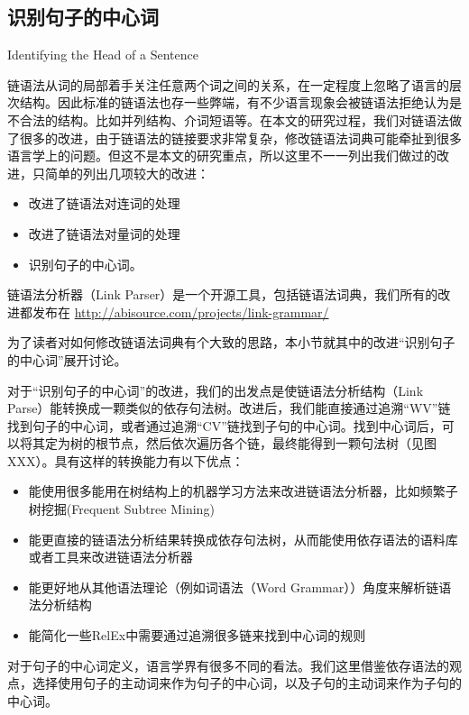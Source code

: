 \subsection{识别句子的中心词}{Identifying the Head of a Sentence}
\label{sec:head}

链语法从词的局部着手关注任意两个词之间的关系，在一定程度上忽略了语言的层次结构。因此标准的链语法也存一些弊端，有不少语言现象会被链语法拒绝认为是不合法的结构。比如并列结构、介词短语等。在本文的研究过程，我们对链语法做了很多的改进，由于链语法的链接要求非常复杂，修改链语法词典可能牵扯到很多语言学上的问题。但这不是本文的研究重点，所以这里不一一列出我们做过的改进，只简单的列出几项较大的改进：

\begin{itemize}
\item 改进了链语法对连词的处理
\item 改进了链语法对量词的处理
\item 识别句子的中心词。
\end{itemize}

链语法分析器（Link Parser）是一个开源工具，包括链语法词典，我们所有的改进都发布在 \url{http://abisource.com/projects/link-grammar/}

为了读者对如何修改链语法词典有个大致的思路，本小节就其中的改进“识别句子的中心词”展开讨论。

对于“识别句子的中心词”的改进，我们的出发点是使链语法分析结构（Link Parse）能转换成一颗类似的依存句法树。改进后，我们能直接通过追溯“WV”链找到句子的中心词，或者通过追溯“CV”链找到子句的中心词。找到中心词后，可以将其定为树的根节点，然后依次遍历各个链，最终能得到一颗句法树（见图XXX）。具有这样的转换能力有以下优点：

\begin{itemize}
\item 能使用很多能用在树结构上的机器学习方法来改进链语法分析器，比如频繁子树挖掘(Frequent Subtree Mining)\cite{Chi2005}
\item 能更直接的链语法分析结果转换成依存句法树，从而能使用依存语法的语料库或者工具来改进链语法分析器
\item 能更好地从其他语法理论（例如词语法（Word Grammar）\cite{Hudson2007}）角度来解析链语法分析结构
\item 能简化一些RelEx中需要通过追溯很多链来找到中心词的规则
\end{itemize}

对于句子的中心词定义，语言学界有很多不同的看法。我们这里借鉴依存语法的观点，选择使用句子的主动词来作为句子的中心词，以及子句的主动词来作为子句的中心词。

